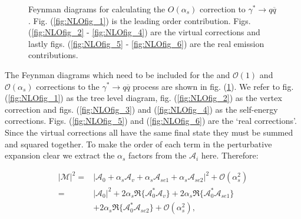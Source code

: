 \begin{figure}[tpb]
			\caption{Feynman diagrams for calculating the $O(\alpha_s)$ correction to $\gamma^*\rightarrow q\overline{q}$.
			Fig. (\ref{fig:NLOfig_1}) is the leading order contribution.  Figs. (\ref{fig:NLOfig_2} - \ref{fig:NLOfig_4})
			are the virtual corrections and lastly figs. (\ref{fig:NLOfig_5} - \ref{fig:NLOfig_6}) are the real emission
			contributions.}
			\label{fig:NLOContributions}

		\end{figure}

		The Feynman diagrams which need to be included for the and $\mathcal{O}(1)$ and $\mathcal{O}(\alpha_s)$ corrections to the
		$\gamma^*\rightarrow q\overline{q}$ process are shown in fig. (\ref{fig:NLOContributions}).  We refer to fig. (\ref{fig:NLOfig_1}) as the tree level diagram,
		fig. (\ref{fig:NLOfig_2}) as the vertex correction and figs. (\ref{fig:NLOfig_3}) and (\ref{fig:NLOfig_4}) as the self-energy corrections.
		Figs. (\ref{fig:NLOfig_5}) and (\ref{fig:NLOfig_6}) are the `real corrections'.  Since the virtual corrections all have the same final state
		they must be summed and squared together.  To make the order of each term in the perturbative expansion clear we extract the $\alpha_s$
		factors from the $\mathcal{A}_i$ here.  Therefore:

		\begin{equation}
		\begin{split}
			|\mathcal{M}|^2 = &|\mathcal{A}_0 + \alpha_s\mathcal{A}_v + \alpha_s\mathcal{A}_{se1} + \alpha_s\mathcal{A}_{se2}|^2 + \mathcal{O}(\alpha_s^2) \\
			                = &|\mathcal{A}_0|^2 + 2\alpha_s\Re\{\mathcal{A}^*_0\mathcal{A}_v\} + 2\alpha_s\Re\{\mathcal{A}^*_0\mathcal{A}_{se1}\} \\
			                  & + 2\alpha_s\Re\{\mathcal{A}^*_0\mathcal{A}_{se2}\} + \mathcal{O}(\alpha_s^2),
			\label{eqn:MEBreakdown}
		\end{split}
		\end{equation}

